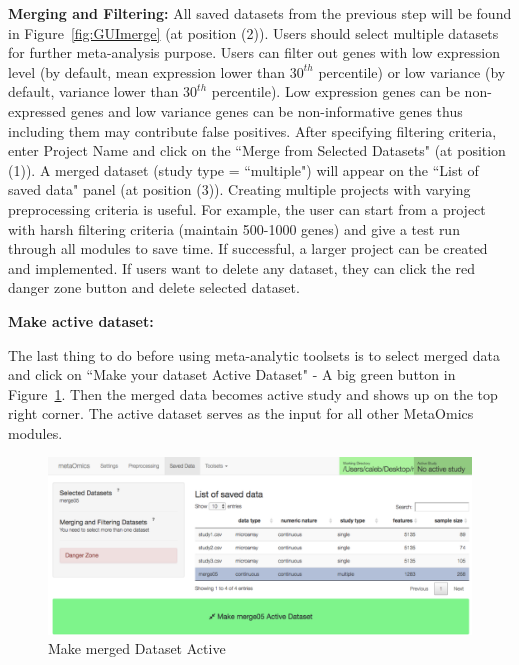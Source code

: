\begin{steps}
\item \textbf{Merging and Filtering:}
All saved datasets from the previous step will be found in  Figure~\ref{fig:GUImerge} (at position {\color{red} (2)}).
Users should select multiple datasets for further meta-analysis purpose.
Users can filter out genes with low expression level (by default, mean expression lower than $30^{th}$ percentile)
or low variance (by default, variance lower than $30^{th}$ percentile).
Low expression genes can be non-expressed genes and low variance genes can be non-informative genes thus including them may contribute false positives.
After specifying filtering criteria, enter Project Name and click on the ``Merge from Selected Datasets" (at position {\color{red} (1)}).
A merged dataset (study type = ``multiple") will appear on the  ``List of saved data" panel (at position {\color{red} (3)}).
Creating multiple projects with varying preprocessing criteria is useful.
For example, the user can start from a project with harsh filtering criteria (maintain 500-1000 genes) and give a test run through all modules to save time.
If successful, a larger project can be created and implemented.
If users want to delete any dataset, they can click the red danger zone button and delete selected dataset.

\item \textbf{Make active dataset:}

The last thing to do before using meta-analytic toolsets is to select merged data and click on 
``Make your dataset Active Dataset" - A big green button in Figure~\ref{fig:active}.
Then the merged data becomes active study and shows up on the top right corner.
The active dataset serves as the input for all other MetaOmics modules.


\end{steps}







\begin{figure}[H]
\begin{center}
\includegraphics[scale=0.7]{./figure/preprocessing/GUImarkActive}
\caption{Make merged Dataset Active}
\label{fig:active}
\end{center}
\end{figure}





